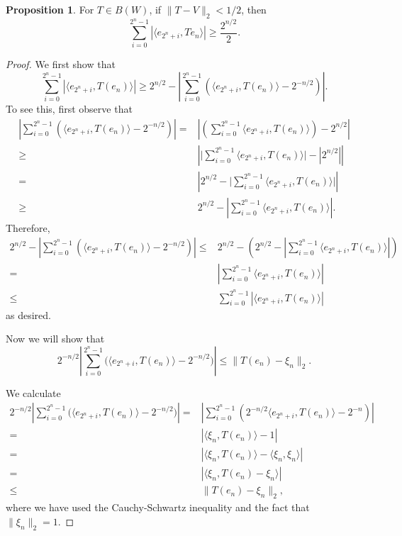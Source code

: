 \documentclass{dcthesis}
\numberwithin{equation}{section}
\numberwithin{equation}{section}
\theoremstyle{definition}
\newtheorem{proposition}[equation]{Proposition}
\begin{document}

\begin{proposition}
\label{prop_ineq}
	For $T\in B(W)$, if $\|T-V\|_2<1/2$, then 
	\[
		\sum_{i=0}^{2^n-1} | \langle e_{2^n+i},Te_n\rangle | \geq \frac{2^{n/2}}{2}.
	\]
\end{proposition}
\begin{proof}
	We first show that 
	\begin{equation*}
		\sum_{i=0}^{2^n-1}|\langle e_{2^n+i}, T(e_n)\rangle|
		\geq 2^{n/2} - \left| \sum_{i=0}^{2^n-1} \left( \langle e_{2^n+i},T(e_n)\rangle - 2^{-n/2} \right) \right|.
	\end{equation*}
	To see this, first observe that
	\begin{align*}
		\left| \sum_{i=0}^{2^n-1} \left( \langle e_{2^n+i},T(e_n)\rangle - 2^{-n/2} \right) \right|
		=& \left| \left( \sum_{i=0}^{2^n-1} \langle e_{2^n+i},T(e_n) \rangle \right) - 2^{n/2} \right| \\
		\geq& \left| \big| \sum_{i=0}^{2^n-1} \langle e_{2^n+i}, T(e_n) \rangle \big| - |2^{n/2}| \right| \\
		=& \left| 2^{n/2} - \big| \sum_{i=0}^{2^n-1} \langle e_{2^n+i}, T(e_n) \rangle \big| \right| \\
		\geq&  2^{n/2} - \left| \sum_{i=0}^{2^n-1} \langle e_{2^n+i}, T(e_n) \rangle \right|.
	\end{align*}
	Therefore,
	\begin{align*}
		2^{n/2} - \left| \sum_{i=0}^{2^n-1} \left( \langle e_{2^n+i},T(e_n) \rangle - 2^{-n/2} \right) \right| 
		\leq& 2^{n/2} - \left( 2^{n/2} - \left| \sum_{i=0}^{2^n-1} \langle e_{2^n+i}, T(e_n) \rangle \right| \right) \\
		=& \left| \sum_{i=0}^{2^n-1} \langle e_{2^n+i}, T(e_n) \rangle \right| \\
		\leq& \sum_{i=0}^{2^n-1}|\langle e_{2^n+i},T(e_n)\rangle|
	\end{align*}
	as desired.

	Now we will show that
	\begin{equation*}
		2^{-n/2} \left| \sum_{i=0}^{2^n-1} \big( \langle e_{2^n+i},T(e_n)\rangle - 2^{-n/2} \big) \right|
		\leq \|T(e_n)-\xi_n\|_2.
	\end{equation*}

	We calculate 
	\begin{align*}
		2^{-n/2} \left| \sum_{i=0}^{2^n-1} \big( \langle e_{2^n+i},T(e_n)\rangle - 2^{-n/2} \big) \right|
		=& \left|\sum_{i=0}^{2^n-1}\left( 2^{-n/2}\langle e_{2^n+i},T(e_n)\rangle - 2^{-n} \right) \right| \\
		=& |\langle \xi_n,T(e_n) \rangle -1| \\
		=& |\langle\xi_n,T(e_n)\rangle - \langle\xi_n,\xi_n\rangle| \\
		=& |\langle\xi_n, T(e_n)-\xi_n\rangle| \\
		\leq& \|T(e_n)-\xi_n\|_2,
	\end{align*}	
	where we have used the Cauchy-Schwartz inequality and the fact that $\|\xi_n\|_2=1$.


\end{proof}
\end{document}
